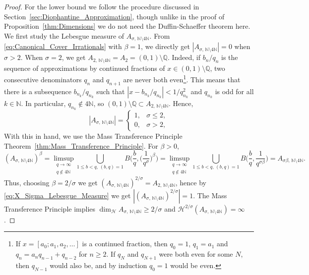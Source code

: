 \documentclass[11pt,reqno]{amsart}
\theoremstyle{definition}
\begin{document}
\begin{proof}
For the lower bound
we follow the procedure discussed in Section~\ref{sec:Diophantine_Approximation}, 
though unlike in the proof of Proposition~\ref{thm:Dimensions} we do not need the Duffin-Schaeffer theorem here. 
We first study the Lebesgue measure of $A_{\sigma,  \, \mathbb N \setminus 4\mathbb N}$.
From \eqref{eq:Canonical_Cover_Irrationals} with $\beta = 1$, 
we directly get $|A_{\sigma,  \, \mathbb N \setminus 4\mathbb N}|=0$ when $\sigma > 2$. 
When $\sigma = 2$, we get $A_{2,  \, \mathbb N \setminus 4\mathbb N} = A_2 = (0,1) \setminus \mathbb Q$. 
Indeed, if $b_n / q_n$ is the sequence of approximations by continued fractions of $x \in (0,1) \setminus \mathbb Q$,
two consecutive denominators $q_n$ and $q_{n+1}$ are never both even\footnote{If $x = [a_0; a_1, a_2, \ldots]$ is a continued fraction, then $q_0 =1$, $q_1 = a_1$ and $q_n = a_n q_{n-1} + q_{n-2}$ for $n \geq 2$. If $q_N$ and $q_{N+1}$ were both even for some $N$, then $q_{N-1}$ would also be, and by induction $q_0 =1$ would be even.}. 
This means that there is a subsequence 
$b_{n_k}/q_{n_k}$ such that $|x - b_{n_k}/q_{n_k}| < 1/q_{n_k}^2$ and $q_{n_k}$ is odd for all $k\in \mathbb N$. 
In particular, $q_{n_k} \not\in 4\mathbb N$, so 
$(0,1) \setminus \mathbb Q \subset A_{2,  \, \mathbb N \setminus 4\mathbb N}$. 
Hence, 
\begin{equation}\label{eq:X_Sigma_Lebesgue_Measure}
|A_{\sigma,  \, \mathbb N \setminus 4\mathbb N}| = \left\{  \begin{array}{ll}
1, & \sigma \leq 2, \\
0, & \sigma > 2,
\end{array}
\right.
\end{equation}
With this in hand, we use the Mass Transference Principle Theorem~\ref{thm:Mass_Transference_Principle}. 
For $\beta > 0$,  
\begin{equation}
(A_{\sigma,  \, \mathbb N \setminus 4\mathbb N})^\beta 
= \limsup_{  \substack{ q \to \infty \\ q \not\in 4\mathbb N } } \bigcup_{  1 \leq b < q, \, (b,q) = 1  } B\Big( \frac{b}{q}, \Big( \frac{1}{q^\sigma} \Big)^\beta \Big) 
= \limsup_{  \substack{ q \to \infty \\ q \not\in 4\mathbb N } } \bigcup_{ 1 \leq b < q, \, (b,q) = 1  } B\Big( \frac{b}{q},  \frac{1}{q^{\sigma \beta}}  \Big)
= A_{\sigma \beta,  \, \mathbb N \setminus 4\mathbb N}.
\end{equation}
Thus, choosing $\beta = 2/\sigma$ 
we get 
$ (A_{\sigma,  \, \mathbb N \setminus 4\mathbb N})^{2/\sigma} 
=
 A_{2,  \, \mathbb N \setminus 4\mathbb N}$, 
hence by \eqref{eq:X_Sigma_Lebesgue_Measure}
we get
$|(A_{\sigma,  \, \mathbb N \setminus 4\mathbb N})^{2/\sigma} |  = 1$. 
The Mass Transference Principle implies $\operatorname{dim}_{\mathcal H} A_{\sigma,  \, \mathbb N \setminus 4\mathbb N} \geq 2/\sigma$ and $\mathcal H^{2/\sigma} (A_{\sigma,  \, \mathbb N \setminus 4\mathbb N}) = \infty$. 
\end{proof}
\end{document}
